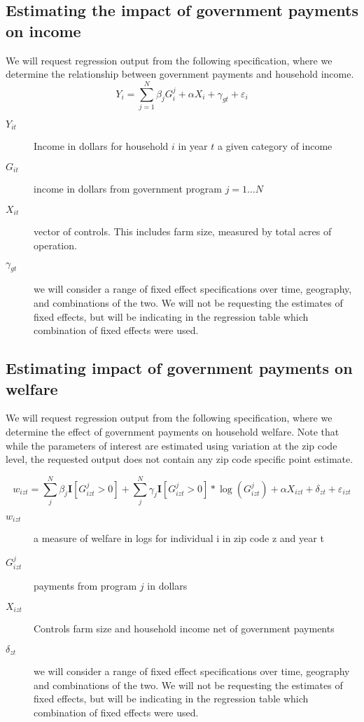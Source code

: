 \documentclass[11pt]{article}
\begin{document}
\subsection{Estimating the impact of government payments on income}
\label{sec:org80c5c76}
We will request regression output from the following specification, where we determine the relationship between government payments and household income.
\[
Y_{i} = \sum_{j=1}^{N} \beta_{j} G_{i}^{j} + \alpha X_{i} + \gamma_{gt} + \varepsilon_{i}
\]
\begin{description}
\item[{\(Y_{it}\)}] Income in dollars for household \(i\) in year \(t\) a given category of income
\item[{\(G_{it}\)}] income in dollars from government program \(j = 1 \dots N\)
\item[{\(X_{it}\)}] vector of controls. This includes farm size, measured by total acres of operation.
\item[{\(\gamma_{gt}\)}] we will consider a range of fixed effect specifications over time, geography, and combinations of the two. We will not be requesting the estimates of fixed effects, but will be indicating in the regression table which combination of fixed effects were used.
\end{description}
\subsection{Estimating impact of government payments on welfare}
\label{sec:org80f5c64}
We will request regression output from the following specification, where we determine the effect of government payments on household welfare. Note that while the parameters of interest are estimated using variation at the zip code level, the requested output does not contain any zip code specific point estimate.

\[
w_{izt} = \sum_{j}^{N} \beta_{j} \mathbf{I}[G_{izt}^{j} > 0] + \sum_{j}^{N}\gamma_{j} \mathbf{I}[G_{izt}^{j}>0] * \log(G_{izt}^{j}) + \alpha X_{izt} + \delta_{zt} + \varepsilon_{izt}
\]

\begin{description}
\item[{\(w_{izt}\)}] a measure of welfare in logs for individual i in zip code z and year t
\item[{\(G_{izt}^{j}\)}] payments from program \(j\) in dollars
\item[{\(X_{izt}\)}] Controls farm size and household income net of government payments
\item[{\(\delta_{zt}\)}] we will consider a range of fixed effect specifications over time, geography and combinations of the two. We will not be requesting the estimates of fixed effects, but will be indicating in the regression table which combination of fixed effects were used.
\end{description}
\end{document}
